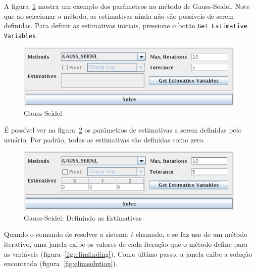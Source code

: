 \documentclass[a4paper,10pt]{report}
\begin{document}
A figura~\ref{fig:seidelestim1} mostra um exemplo dos parâmetros no método de Gauss-Seidel. Note que ao selecionar o método, as estimativas ainda não são possíveis de serem definidas. Para definir as estimativas iniciais, pressione o botão \verb|Get Estimative Variables|.

\begin{figure}[ht]
 \centering
 \includegraphics[scale=0.8, bb=0 0 354 100]{screen-C-seidel-before-estim.png}
 \caption{Gauss-Seidel}
 \label{fig:seidelestim1}
\end{figure}

É possível ver na figura~\ref{fig:seidelafterestim} os parâmetros de estimativas a serem definidas pelo usuário. Por padrão, todas as estimativas são definidas como zero.

\begin{figure}[ht]
 \centering
 \includegraphics[scale=0.8, bb=0 0 354 100]{screen-D-seidel-after-estim.png}
 \caption{Gauss-Seidel: Definindo as Estimativas}
 \label{fig:seidelafterestim}
\end{figure}

Quando o comando de resolver o sistema é chamado, e se faz uso de um método iterativo, uma janela exibe os valores de cada iteração que o método define para as variáveis (figura~\ref{fig:elimfinding}). Como último passo, a janela exibe a solução encontrada (figura~\ref{fig:elimsolution}).
\end{document}
